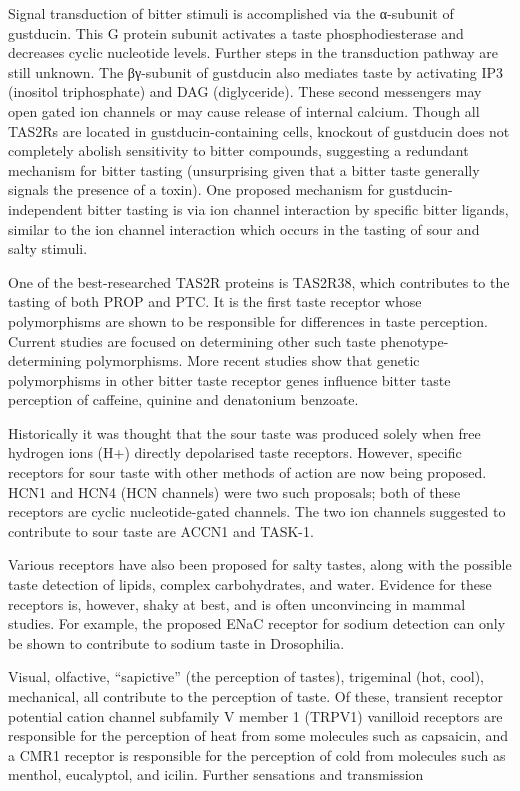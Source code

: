 Signal transduction of bitter stimuli is accomplished via the α-subunit of gustducin. This G protein subunit activates a taste phosphodiesterase and decreases cyclic nucleotide levels. Further steps in the transduction pathway are still unknown. The βγ-subunit of gustducin also mediates taste by activating IP3 (inositol triphosphate) and DAG (diglyceride). These second messengers may open gated ion channels or may cause release of internal calcium. Though all TAS2Rs are located in gustducin-containing cells, knockout of gustducin does not completely abolish sensitivity to bitter compounds, suggesting a redundant mechanism for bitter tasting (unsurprising given that a bitter taste generally signals the presence of a toxin). One proposed mechanism for gustducin-independent bitter tasting is via ion channel interaction by specific bitter ligands, similar to the ion channel interaction which occurs in the tasting of sour and salty stimuli.

One of the best-researched TAS2R proteins is TAS2R38, which contributes to the tasting of both PROP and PTC. It is the first taste receptor whose polymorphisms are shown to be responsible for differences in taste perception. Current studies are focused on determining other such taste phenotype-determining polymorphisms. More recent studies show that genetic polymorphisms in other bitter taste receptor genes influence bitter taste perception of caffeine, quinine and denatonium benzoate.

Historically it was thought that the sour taste was produced solely when free hydrogen ions (H+) directly depolarised taste receptors. However, specific receptors for sour taste with other methods of action are now being proposed. HCN1 and HCN4 (HCN channels) were two such proposals; both of these receptors are cyclic nucleotide-gated channels. The two ion channels suggested to contribute to sour taste are ACCN1 and TASK-1.

Various receptors have also been proposed for salty tastes, along with the possible taste detection of lipids, complex carbohydrates, and water. Evidence for these receptors is, however, shaky at best, and is often unconvincing in mammal studies. For example, the proposed ENaC receptor for sodium detection can only be shown to contribute to sodium taste in Drosophilia.

Visual, olfactive, ``sapictive'' (the perception of tastes), trigeminal (hot, cool), mechanical, all contribute to the perception of taste. Of these, transient receptor potential cation channel subfamily V member 1 (TRPV1) vanilloid receptors are responsible for the perception of heat from some molecules such as capsaicin, and a CMR1 receptor is responsible for the perception of cold from molecules such as menthol, eucalyptol, and icilin.
Further sensations and transmission

